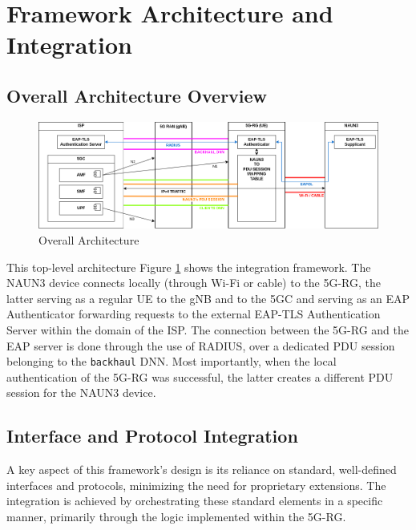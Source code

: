 \section{Framework Architecture and Integration}

\subsection{Overall Architecture Overview}

\begin{figure}
    \centering
    \includegraphics[width=1\linewidth]{figs/overall-topology.png}
    \caption{Overall Architecture}
    \label{fig:Overall Architecture}
\end{figure}

This top-level architecture Figure \ref{fig:Overall Architecture} shows the integration framework. The \ac{NAUN3} device connects locally (through Wi-Fi or cable) to the \ac{5G-RG}, the latter serving as a regular \ac{UE} to the \ac{gNB} and to the \ac{5GC} and serving as an \ac{EAP} Authenticator forwarding requests to the external \ac{EAP-TLS} Authentication Server within the domain of the \ac{ISP}. The connection between the \ac{5G-RG} and the \ac{EAP} server is done through the use of \ac{RADIUS}, over a dedicated \ac{PDU} session belonging to the \texttt{backhaul} \ac{DNN}. Most importantly, when the local authentication of the \ac{5G-RG} was successful, the latter creates a different \ac{PDU} session for the \ac{NAUN3} device.

\subsection{Interface and Protocol Integration}

A key aspect of this framework's design is its reliance on standard, well-defined interfaces and protocols, minimizing the need for proprietary extensions. The integration is achieved by orchestrating these standard elements in a specific manner, primarily through the logic implemented within the \ac{5G-RG}.

